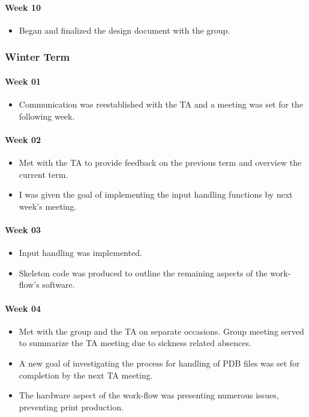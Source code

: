 \paragraph{Week 10}
\begin{itemize}
\item Began and finalized the design document with the group.
\end{itemize}

\subsubsection{Winter Term}
\paragraph{Week 01}
\begin{itemize}
\item Communication was reestablished with the TA and a meeting was set for the following week.
\end{itemize}
\paragraph{Week 02}
\begin{itemize}
\item Met with the TA to provide feedback on the previous term and overview the current term.
\item I was given the goal of implementing the input handling functions by next week's meeting.
\end{itemize}
\paragraph{Week 03}
\begin{itemize}
\item Input handling was implemented.
\item Skeleton code was produced to outline the remaining aspects of the work-flow's software.
\end{itemize}
\paragraph{Week 04}
\begin{itemize}
\item Met with the group and the TA on separate occasions. Group meeting served to summarize the TA meeting due to sickness related absences.
\item A new goal of investigating the process for handling of PDB files was set for completion by the next TA meeting.
\item The hardware aspect of the work-flow was presenting numerous issues, preventing print production.
\end{itemize}
